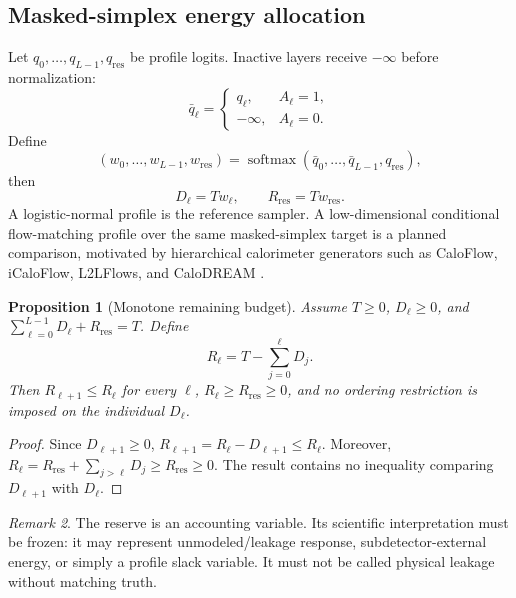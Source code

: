 \documentclass[11pt]{article}
\newtheorem{proposition}{Proposition}[section]
\theoremstyle{definition}
\theoremstyle{remark}
\newtheorem{remark}[proposition]{Remark}
\newcommand{\softmax}{\operatorname{softmax}}
\begin{document}
\subsection{Masked-simplex energy allocation}
Let $q_0,\ldots,q_{L-1},q_{\mathrm{res}}$ be profile logits. Inactive layers receive $-\infty$ before normalization:
\begin{equation}
  \bar q_\ell=
  \begin{cases}
  q_\ell,&A_\ell=1,\\
  -\infty,&A_\ell=0.
  \end{cases}
\end{equation}
Define
\begin{equation}
  (w_0,\ldots,w_{L-1},w_{\mathrm{res}})
  =\softmax(\bar q_0,\ldots,\bar q_{L-1},q_{\mathrm{res}}),
\end{equation}
then
\begin{equation}
  D_\ell=T w_\ell,
  \qquad R_{\mathrm{res}}=T w_{\mathrm{res}}.
  \label{eq:simplex_profile}
\end{equation}
A logistic-normal profile is the reference sampler. A low-dimensional conditional flow-matching profile over the same masked-simplex target is a planned comparison, motivated by hierarchical calorimeter generators such as CaloFlow, iCaloFlow, L2LFlows, and CaloDREAM \citep{caloflow,icaloflow,l2lflows,convl2lflows,calodream}.

\begin{proposition}[Monotone remaining budget]
Assume $T\ge0$, $D_\ell\ge0$, and $\sum_{\ell=0}^{L-1}D_\ell+R_{\mathrm{res}}=T$. Define
\begin{equation}
  R_\ell=T-\sum_{j=0}^{\ell}D_j.
\end{equation}
Then $R_{\ell+1}\le R_\ell$ for every $\ell$, $R_\ell\ge R_{\mathrm{res}}\ge0$, and no ordering restriction is imposed on the individual $D_\ell$.
\end{proposition}
\begin{proof}
Since $D_{\ell+1}\ge0$,
$R_{\ell+1}=R_\ell-D_{\ell+1}\le R_\ell$.
Moreover,
$R_\ell=R_{\mathrm{res}}+\sum_{j>\ell}D_j\ge R_{\mathrm{res}}\ge0$.
The result contains no inequality comparing $D_{\ell+1}$ with $D_\ell$.
\end{proof}

\begin{remark}
The reserve is an accounting variable. Its scientific interpretation must be frozen: it may represent unmodeled/leakage response, subdetector-external energy, or simply a profile slack variable. It must not be called physical leakage without matching truth.
\end{remark}
\end{document}

